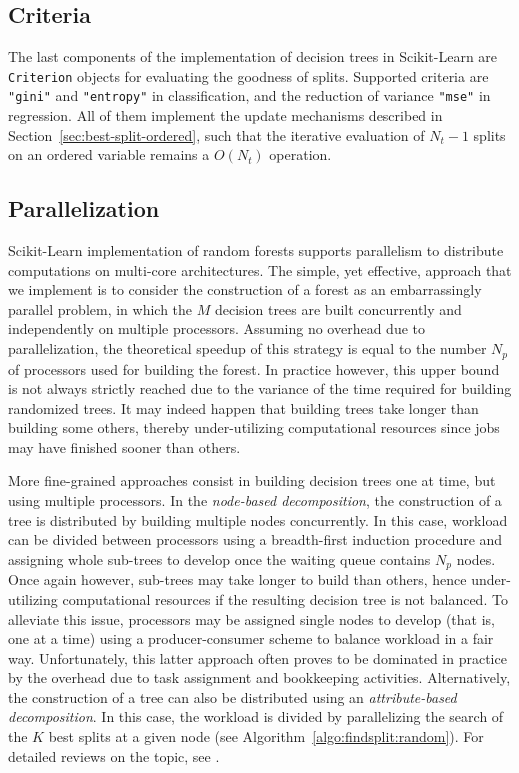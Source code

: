 \subsection{Criteria}

The last components of the implementation of decision trees in Scikit-Learn are
\texttt{Criterion} objects for evaluating the goodness of splits. Supported
criteria are \texttt{"gini"} and \texttt{"entropy"} in classification, and the
reduction of variance \texttt{"mse"} in regression. All of them implement the
update mechanisms described in Section~\ref{sec:best-split-ordered}, such that
the iterative evaluation of $N_t-1$ splits on an ordered variable remains a
$O(N_t)$ operation.

\subsection{Parallelization}

Scikit-Learn implementation of random forests supports parallelism to
distribute computations on multi-core architectures. The simple, yet effective,
approach that we implement is to consider the construction of a forest as an
embarrassingly parallel problem, in which the $M$ decision trees are built
concurrently and independently on multiple processors. Assuming no overhead due
to parallelization, the theoretical speedup of this strategy is equal to the
number $N_p$ of processors used for building the forest. In practice however,
this upper bound is not always strictly reached due to the variance of the time
required for building randomized trees. It may indeed happen that building
trees take longer  than building some others, thereby under-utilizing
computational resources since jobs may have finished sooner than others.

More fine-grained approaches consist in building decision trees one at time,
but using multiple processors. In the \textit{node-based decomposition}, the
construction of a tree is distributed by building multiple nodes concurrently.
In this case, workload can be divided between processors using a breadth-first
induction procedure and assigning whole sub-trees to develop once the waiting
queue contains $N_p$ nodes. Once again however, sub-trees may take longer to
build than others, hence under-utilizing computational resources if the
resulting decision tree is not balanced. To alleviate this issue, processors
may be assigned single nodes to develop (that is, one at a time) using a producer-consumer scheme to
balance workload in a fair way. Unfortunately, this latter approach often proves to be
dominated in practice by the overhead due to task assignment and bookkeeping
activities. Alternatively, the construction of a tree can also be distributed
using an \textit{attribute-based decomposition}. In this case, the workload is
divided by parallelizing the search of the $K$ best splits at a given node (see
Algorithm~\ref{algo:findsplit:random}). For detailed reviews on the topic, see
\citep{kufrin:1997,srivastava:2002}.

